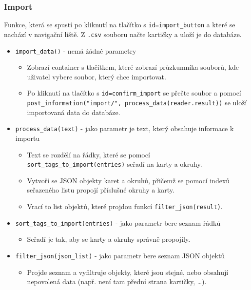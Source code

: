 \documentclass[11pt]{article}
\providecommand{\tightlist}{\setlength{\itemsep}{1pt}\setlength{\parskip}{1pt}}
\let\oldtexttt\texttt
\renewcommand{\texttt}[1]{\oldtexttt{\textcolor{codehighlight}{#1}}}
\begin{document}
\hypertarget{import}{%
\subsubsection{Import}\label{import}}

Funkce, která se spustí po kliknutí na tlačítko s
\texttt{id=import\_button} a které se nachází v navigační liště. Z
\texttt{.csv} souboru načte kartičky a uloží je do databáze.

\begin{itemize}
\tightlist
\item
  \texttt{import\_data()} - nemá žádné parametry

  \begin{itemize}
  \tightlist
  \item
    Zobrazí container s tlačítkem, které zobrazí průzkumníka souborů,
    kde uživatel vybere soubor, který chce importovat.
  \item
    Po kliknutí na tlačítko s \texttt{id=confirm\_import} se přečte
    soubor a pomocí
    \texttt{post\_information("import/",\ process\_data(reader.result))}
    se uloží importovaná data do databáze.
  \end{itemize}
\item
  \texttt{process\_data(text)} - jako parametr je text, který obsahuje
  informace k importu

  \begin{itemize}
  \tightlist
  \item
    Text se rozdělí na řádky, které se pomocí
    \texttt{sort\_tags\_to\_import(entries)} seřadí na karty a okruhy.
  \item
    Vytvoří se JSON objekty karet a okruhů, přičemž se pomocí indexů
    seřazeného listu propojí příslušné okruhy a karty.
  \item
    Vrací to list objektů, které projdou funkcí
    \texttt{filter\_json(result)}.
  \end{itemize}
\item
  \texttt{sort\_tags\_to\_import(entries)} - jako parametr bere seznam
  řádků

  \begin{itemize}
  \tightlist
  \item
    Seřadí je tak, aby se karty a okruhy správně propojily.
  \end{itemize}
\item
  \texttt{filter\_json(json\_list)} - jako parametr bere seznam JSON
  objektů

  \begin{itemize}
  \tightlist
  \item
    Projde seznam a vyfiltruje objekty, které jsou stejné, nebo obsahují
    nepovolená data (např. není tam přední strana kartičky, \ldots{}).
  \end{itemize}
\end{itemize}
\end{document}
